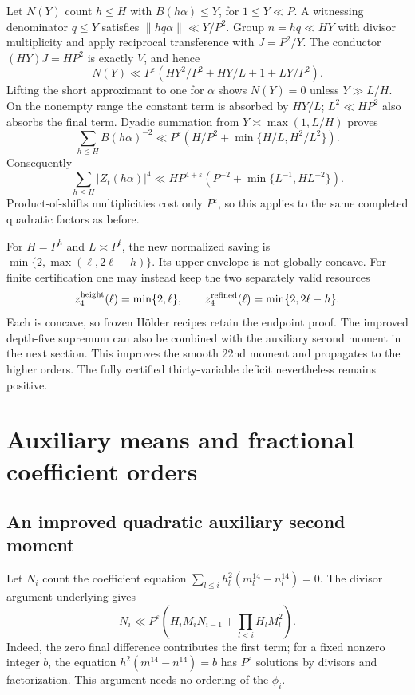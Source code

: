 \documentclass[11pt,letterpaper]{article}
\theoremstyle{remark}
\newcommand{\eps}{\varepsilon}
\begin{document}
Let $N(Y)$ count $h\le H$ with $B(h\alpha)\le Y$, for $1\le Y\ll P$.
A witnessing denominator $q\le Y$ satisfies $\|hq\alpha\|\ll Y/P^2$.
Group $n=hq\ll HY$ with divisor multiplicity and apply reciprocal transference
with $J=P^2/Y$. The conductor $(HY)J=HP^2$ is exactly $V$, and hence
\[
 N(Y)\ll P^\eps\left(HY^2/P^2+HY/L+1+LY/P^2\right).
\]
Lifting the short approximant to one for $\alpha$ shows $N(Y)=0$ unless
$Y\gg L/H$. On the nonempty range the constant term is absorbed by $HY/L$;
$L^2\ll HP^2$ also absorbs the final term. Dyadic summation from
$Y\asymp\max(1,L/H)$ proves
\[
 \sum_{h\le H} B(h\alpha)^{-2}
 \ll P^\eps\left(H/P^2+\min\{H/L,H^2/L^2\}\right).
\]
Consequently
\begin{equation}\label{eq:quadratic-distribution}
 \sum_{h\le H}|Z_t(h\alpha)|^4
 \ll HP^{4+\eps}\left(P^{-2}+\min\{L^{-1},HL^{-2}\}\right).
\end{equation}
Product-of-shifts multiplicities cost only $P^\eps$, so this applies to the same
completed quadratic factors as before.

For $H=P^h$ and $L\asymp P^\ell$, the new normalized saving is
$\min\{2,\max(\ell,2\ell-h)\}$. Its upper envelope is not globally concave.
For finite certification one may instead keep the two separately valid resources
\[
 z_4^{\rm height}(\ell)=\min\{2,\ell\},\qquad
 z_4^{\rm refined}(\ell)=\min\{2,2\ell-h\}.
\]
Each is concave, so frozen H\"older recipes retain the endpoint proof. The improved
depth-five supremum can also be combined with the auxiliary second moment in the
next section. This improves the smooth 22nd moment and propagates to the higher
orders. The fully certified thirty-variable deficit nevertheless remains positive.

\section{Auxiliary means and fractional coefficient orders}

\subsection{An improved quadratic auxiliary second moment}

Let $N_i$ count the coefficient equation
$\sum_{l\le i}h_l^2(m_l^{14}-n_l^{14})=0$. The divisor argument underlying
\cite[Lemma~3.8]{VW95} gives
\[
 N_i\ll P^\eps\left(H_iM_i N_{i-1}+
                              \prod_{l<i}H_lM_l^2\right).
\]
Indeed, the zero final difference contributes the first term; for a fixed nonzero
integer $b$, the equation $h^2(m^{14}-n^{14})=b$ has $P^\eps$ solutions by divisors
and factorization. This argument needs no ordering of the $\phi_i$.
\end{document}
